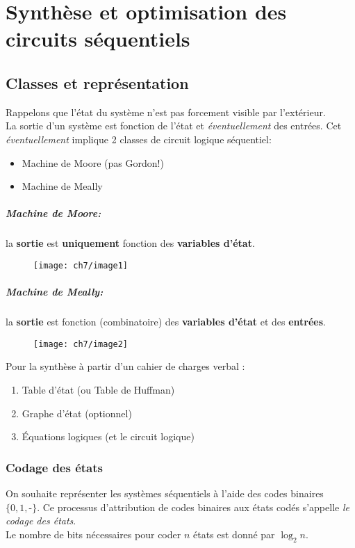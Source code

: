 \chapter{Synthèse et optimisation des circuits séquentiels}
\section{Classes et représentation}
Rappelons que l'état du système n'est pas forcement visible par l'extérieur.\\
La sortie d'un système est fonction de l'état et \textit{éventuellement} des entrées. Cet \textit{éventuellement} implique 2 classes de circuit logique séquentiel:
\begin{itemize}
	\item Machine de Moore (pas Gordon!)
	\item Machine de Meally
\end{itemize}
\paragraph{Machine de Moore:}
la \textbf{sortie} est \textbf{uniquement} fonction des \textbf{variables d'état}.
\begin{figure}[H]
	\centering
	\texttt{[image: ch7/image1]}
\end{figure}
\paragraph{Machine de Meally:}
la \textbf{sortie} est fonction (combinatoire) des \textbf{variables d'état} et des \textbf{entrées}.
\begin{figure}[H]
	\centering
	\texttt{[image: ch7/image2]}
\end{figure}

Pour la synthèse à partir d'un cahier de charges verbal :
\begin{enumerate}
	\item Table d'état (ou Table de Huffman)
	\item Graphe d'état (optionnel)
	\item Équations logiques (et le circuit logique)
\end{enumerate}
\subsection{Codage des états}
On souhaite représenter les systèmes séquentiels à l'aide des codes binaires $\{0, 1, \text{-}\}$. Ce processus d'attribution de codes binaires aux états codés s'appelle \textit{le codage des états}.\\
Le nombre de bits nécessaires pour coder $n$ états est donné par $\log_2n$.
